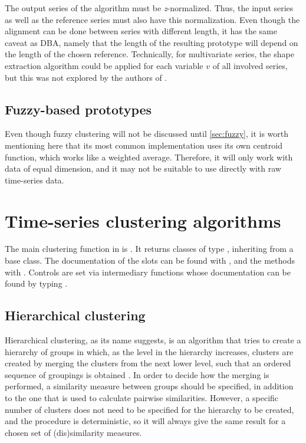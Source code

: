 The output series of the algorithm must be \textit{z}-normalized.
Thus, the input series as well as the reference series must also have this normalization.
Even though the alignment can be done between series with different length,
it has the same caveat as DBA,
namely that the length of the resulting prototype will depend on the length of the chosen reference.
Technically, for multivariate series,
the shape extraction algorithm could be applied for each variable $v$ of all involved series,
but this was not explored by the authors of \kshape{}.

\subsection{Fuzzy-based prototypes}
\label{sec:fuzzy-cent}

Even though fuzzy clustering will not be discussed until \cref{sec:fuzzy},
it is worth mentioning here that its most common implementation uses its own centroid function,
which works like a weighted average.
Therefore, it will only work with data of equal dimension,
and it may not be suitable to use directly with raw time-series data.

\section{Time-series clustering algorithms}
\label{sec:clustering}

The main clustering function in \dtwclust{} is .
It returns classes of type ,
inheriting from a base  class.
The documentation of the slots can be found with ,
and the methods with .
Controls are set via intermediary functions whose documentation can be found by typing .

\subsection{Hierarchical clustering}
\label{sec:hc}

Hierarchical clustering,
as its name suggests,
is an algorithm that tries to create a hierarchy of groups in which,
as the level in the hierarchy increases,
clusters are created by merging the clusters from the next lower level,
such that an ordered sequence of groupings is obtained \citep{hastie2009}.
In order to decide how the merging is performed,
a similarity measure between groups should be specified,
in addition to the one that is used to calculate pairwise similarities.
However, a specific number of clusters does not need to be specified for the hierarchy to be created,
and the procedure is deterministic,
so it will always give the same result for a chosen set of (dis)similarity measures.


